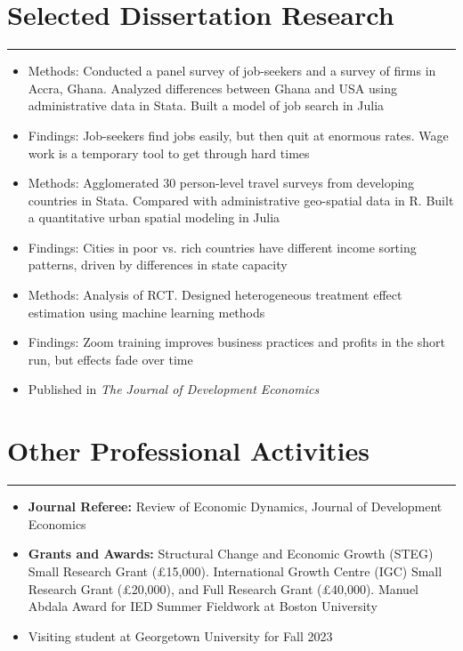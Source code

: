 \documentclass[10pt]{article}
\newenvironment{customitemize}
{ \begin{itemize}[leftmargin=\parindent, topsep = 0.2pt, itemsep = -3pt] }
{\end{itemize} }
\begin{document}
\section*{Selected Dissertation Research}
\noindent \rule{\textwidth}{1pt} 
\begin{customitemize}
\item Methods: Conducted a panel survey of job-seekers and a survey of firms in Accra, Ghana. Analyzed differences between Ghana and USA using administrative data in Stata. Built a model of job search in Julia
\item Findings: Job-seekers find jobs easily, but then quit at enormous rates. Wage work is a temporary tool to get through hard times 
\end{customitemize}
\begin{customitemize}
	\item Methods: Agglomerated 30 person-level travel surveys from developing countries in Stata. Compared with administrative geo-spatial data in R. Built a quantitative urban spatial modeling in Julia
	\item Findings: Cities in poor vs. rich countries have different income sorting patterns, driven by differences in state capacity
\end{customitemize}
\begin{customitemize}
	\item Methods: Analysis of RCT. Designed heterogeneous treatment effect estimation using machine learning methods
	\item Findings: Zoom training improves business practices and profits in the short run, but effects fade over time
	\item Published in \textit{The Journal of Development Economics}
\end{customitemize}

\section*{Other Professional Activities}
\noindent \rule{\textwidth}{1pt} 
\begin{customitemize}
	\item \textbf{Journal Referee:} Review of Economic Dynamics, Journal of Development Economics
	\item \textbf{Grants and Awards:} Structural Change and Economic Growth (STEG) Small Research Grant (\pounds15,000). International Growth Centre (IGC) Small Research Grant (\pounds20,000), and Full Research Grant (\pounds40,000). Manuel Abdala Award for IED Summer Fieldwork at Boston University
	\item Visiting student at Georgetown University for Fall 2023
\end{customitemize}
\end{document}
